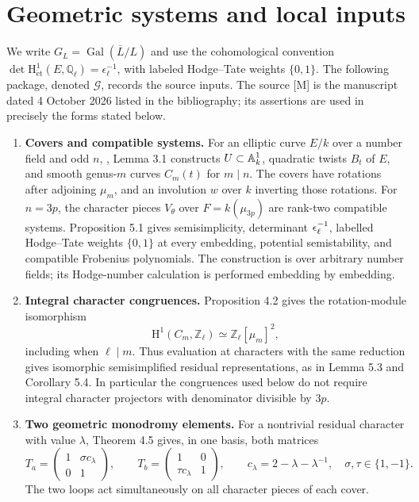 \documentclass[11pt,a4paper]{article}
\theoremstyle{definition}\newtheorem{definition}[theorem]{Definition}
\theoremstyle{remark}\newtheorem*{remark}{Remark}
\newcommand{\Q}{\mathbb Q}\newcommand{\Z}{\mathbb Z}
\newcommand{\Gal}{\operatorname{Gal}}\newcommand{\Res}{\operatorname{Res}}
\newcommand{\HH}{\mathrm H^1_{\mathrm{\acute et}}}
\newcommand{\srcM}{\cite{M}}
\newcommand{\Ginput}{\mathcal G}
\begin{document}
\section{Geometric systems and local inputs}
\label{sec:package}

We write \(G_L=\Gal(\overline L/L)\) and use the cohomological convention
\(\det\HH(E,\Q_\ell)=\epsilon_\ell^{-1}\), with labeled Hodge--Tate weights
\(\{0,1\}\). The following package, denoted \(\Ginput\), records the source inputs.
The source [M] is the manuscript dated 4 October 2026 listed in the bibliography;
its assertions are used in precisely the forms stated below.

\begin{enumerate}[label=\textbf{G\arabic*.},leftmargin=40pt]
\item \textbf{Covers and compatible systems.}
For an elliptic curve $E/k$ over a number field and odd $n$, \srcM,
Lemma 3.1 constructs $U\subset\mathbb A^1_k$, quadratic twists $B_t$ of $E$, and
smooth genus-$m$ curves $C_m(t)$ for $m\mid n$. The covers have rotations
after adjoining $\mu_m$, and an involution $w$ over $k$ inverting those
rotations. For $n=3p$, the character pieces $V_\theta$ over
$F=k(\mu_{3p})$ are rank-two compatible systems. Proposition 5.1 gives
semisimplicity, determinant $\epsilon_\ell^{-1}$, labelled Hodge--Tate weights
$\{0,1\}$ at every embedding, potential semistability, and compatible
Frobenius polynomials. The construction is over arbitrary number fields;
its Hodge-number calculation is performed embedding by embedding.

\item \textbf{Integral character congruences.}
Proposition 4.2 gives the rotation-module isomorphism
\[
\mathrm H^1(C_m,\Z_\ell)\simeq\Z_\ell[\mu_m]^2,
\]
including when $\ell\mid m$. Thus evaluation at characters with the same
reduction gives isomorphic semisimplified residual representations, as in
Lemma 5.3 and Corollary 5.4. In particular the congruences used below do not
require integral character projectors with denominator divisible by $3p$.

\item \textbf{Two geometric monodromy elements.}
For a nontrivial residual character with value $\lambda$, Theorem 4.5 gives,
in one basis, both matrices
\[
T_a=\begin{pmatrix}1&\sigma c_\lambda\\0&1\end{pmatrix},\qquad
T_b=\begin{pmatrix}1&0\\\tau c_\lambda&1\end{pmatrix},\qquad
c_\lambda=2-\lambda-\lambda^{-1},\quad\sigma,\tau\in\{1,-1\}.
\]
The two loops act simultaneously on all character pieces of each cover.


\end{enumerate}
\end{document}
